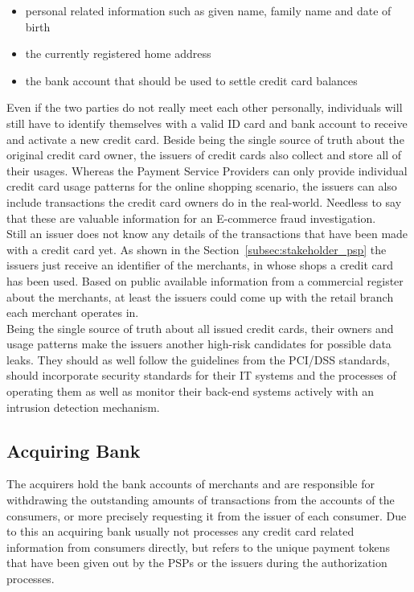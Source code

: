 \begin{itemize}
		\item personal related information such as given name, family name and date of birth
		\item the currently registered home address
		\item the bank account that should be used to settle credit card balances
\end{itemize}

Even if the two parties do not really meet each other personally, individuals will still have to identify themselves with a valid ID card and bank account to receive and activate a new credit card. Beside being the single source of truth about the original credit card owner, the issuers of credit cards also collect and store all of their usages. Whereas the Payment Service Providers can only provide individual credit card usage patterns for the online shopping scenario, the issuers can also include transactions the credit card owners do in the real-world. Needless to say that these are valuable information for an \gls{E-commerce} fraud investigation. \\

Still an issuer does not know any details of the transactions that have been made with a credit card yet. As shown in the Section~\ref{subsec:stakeholder_psp} the issuers just receive an identifier of the merchants, in whose shops a credit card has been used. Based on public available information from a commercial register about the merchants, at least the issuers could come up with the retail branch each merchant operates in. \\

Being the single source of truth about all issued credit cards, their owners and usage patterns make the issuers another high-risk candidates for possible data leaks. They should as well follow the guidelines from the \gls{PCI/DSS} standards, should incorporate security standards for their \gls{IT} systems and the processes of operating them as well as monitor their back-end systems actively with an intrusion detection mechanism.


\subsection{Acquiring Bank}
\label{subsec:stakeholder_acquirer}

The acquirers hold the bank accounts of merchants and are responsible for withdrawing the outstanding amounts of transactions from the accounts of the consumers, or more precisely requesting it from the issuer of each consumer. Due to this an acquiring bank usually not processes any credit card related information from consumers directly, but refers to the unique payment tokens that have been given out by the \gls{PSP}s or the issuers during the authorization processes. \\


